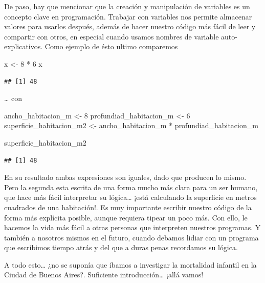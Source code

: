 \documentclass[
]{book}
\newenvironment{Shaded}{\begin{snugshade}}{\end{snugshade}}
\newcommand{\DecValTok}[1]{\textcolor[rgb]{0.00,0.00,0.81}{#1}}
\newcommand{\NormalTok}[1]{#1}
\newcommand{\OtherTok}[1]{\textcolor[rgb]{0.56,0.35,0.01}{#1}}
\newcommand{\SpecialCharTok}[1]{\textcolor[rgb]{0.00,0.00,0.00}{#1}}
\begin{document}
De paso, hay que mencionar que la creación y manipulación de variables es un concepto clave en programación. Trabajar con variables nos permite almacenar valores para usarlos después, además de hacer nuestro código más fácil de leer y compartir con otros, en especial cuando usamos nombres de variable auto-explicativos. Como ejemplo de ésto ultimo comparemos

\begin{Shaded}
\begin{Highlighting}[]
\NormalTok{x }\OtherTok{\textless{}{-}} \DecValTok{8} \SpecialCharTok{*} \DecValTok{6}
\NormalTok{x}
\end{Highlighting}
\end{Shaded}

\begin{verbatim}
## [1] 48
\end{verbatim}

\ldots{} con

\begin{Shaded}
\begin{Highlighting}[]
\NormalTok{ancho\_habitacion\_m }\OtherTok{\textless{}{-}} \DecValTok{8}
\NormalTok{profundiad\_habitacion\_m }\OtherTok{\textless{}{-}} \DecValTok{6}
\NormalTok{superficie\_habitacion\_m2 }\OtherTok{\textless{}{-}}\NormalTok{ ancho\_habitacion\_m }\SpecialCharTok{*}\NormalTok{ profundiad\_habitacion\_m}

\NormalTok{superficie\_habitacion\_m2}
\end{Highlighting}
\end{Shaded}

\begin{verbatim}
## [1] 48
\end{verbatim}

En su resultado ambas expresiones son iguales, dado que producen lo mismo. Pero la segunda esta escrita de una forma mucho más clara para un ser humano, que hace más fácil interpretar su lógica\ldots{} ¡está calculando la superficie en metros cuadrados de una habitación!. Es muy importante escribir nuestro código de la forma más explícita posible, aunque requiera tipear un poco más. Con ello, le hacemos la vida más fácil a otras personas que interpreten nuestros programas. Y también a nosotros mismos en el futuro, cuando debamos lidiar con un programa que escribimos tiempo atrás y del que a duras penas recordamos su lógica.

A todo esto\ldots{} ¿no se suponía que íbamos a investigar la mortalidad infantil en la Ciudad de Buenos Aires?. Suficiente introducción\ldots{} ¡allá vamos!
\end{document}
